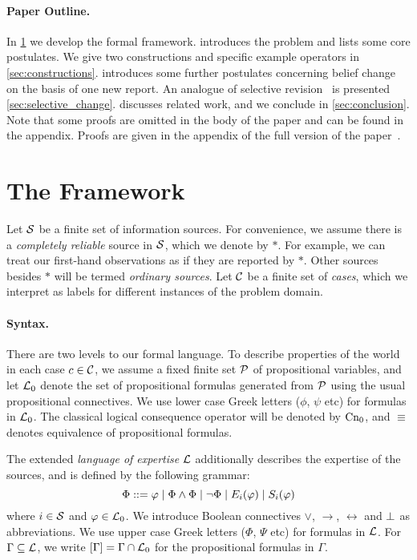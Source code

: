 \paragraph{Paper Outline.} In \cref{sec:framework} we develop the formal
framework.  introduces the problem and lists some core
postulates. We give two constructions and specific example operators in
\cref{sec:constructions}.  introduces some
further postulates concerning belief change on the basis of one new report. An
analogue of selective revision~\cite{ferme1999selective} is presented
\cref{sec:selective_change}.  discusses related work, and
we conclude in \cref{sec:conclusion}.
\ifdefined\thisistheprerint
    Note that some proofs are omitted in the body of the paper and can be found
    in the appendix.
\else
    Proofs are given in the appendix of the full version of the
    paper~\cite{singleton_booth_22_preprint}.
\fi
{}

\section{The Framework}
\label{sec:framework}

Let $\S$ be a finite set of information sources. For convenience, we assume
there is a \emph{completely reliable} source in $\S$, which we denote by
$\ast$.  For example, we can treat our first-hand observations as if they are
reported by $\ast$. Other sources besides $\ast$ will be termed \emph{ordinary
sources}.  Let $\C$ be a finite set of \emph{cases}, which we interpret as
labels for different instances of the problem domain.

\paragraph{Syntax.}

There are two levels to our formal language. To describe properties of the
world in each case $c \in \C$, we assume a fixed finite set $\propvars$ of propositional
variables, and let $\lprop$ denote the set of propositional formulas generated
from $\propvars$ using the usual propositional connectives. We use lower case
Greek letters ($\phi$, $\psi$ etc) for formulas in $\lprop$. The
classical logical consequence operator will be denoted by $\cnprop$, and
$\equiv$ denotes equivalence of propositional formulas.

The extended \emph{language of expertise} $\lext$ additionally describes the
expertise of the sources, and is defined by the following grammar:
\[
    \Phi ::= \phi \mid
             \Phi \land \Phi \mid
             \neg \Phi \mid
             E_i(\phi) \mid
             S_i(\phi)
             \\
\]
where $i\in \S$ and $\phi \in \lprop$. We introduce Boolean connectives
$\lor$, $\rightarrow$, $\leftrightarrow$ and $\falsum$ as
abbreviations. We use upper case Greek letters ($\Phi$, $\Psi$ etc)
for formulas in $\lext$.
%
For $\Gamma \subseteq \lext$, we write $\proppart{\Gamma} = \Gamma \cap
\lprop$ for the propositional formulas in $\Gamma$.

